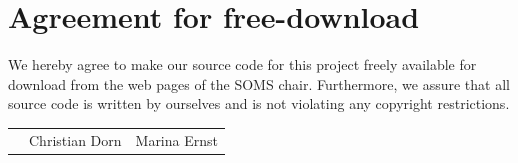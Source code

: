 \documentclass[11pt]{article}
\begin{document}

\newpage


\newpage
\section*{Agreement for free-download}
\bigskip


\bigskip


\large We hereby agree to make our source code for this project freely available for download from the web pages of the SOMS chair. Furthermore, we assure that all source code is written by ourselves and is not violating any copyright restrictions.

\begin{center}

\bigskip


\bigskip


\begin{tabular}{@{}p{3.3cm}@{}p{6cm}@{}@{}p{6cm}@{}}
\begin{minipage}{3cm}

\end{minipage}
&
\begin{minipage}{6cm}
\vspace{2mm} \large Christian Dorn

 \vspace{\baselineskip}

\end{minipage}
&
\begin{minipage}{6cm}

\large Marina Ernst

\end{minipage}
\end{tabular}


\end{center}
\newpage







\tableofcontents

\newpage

\end{document}
